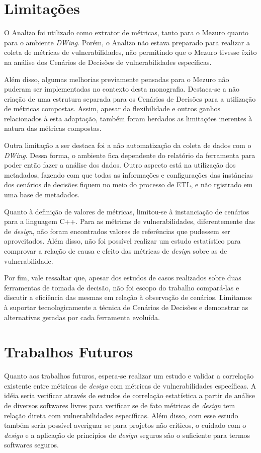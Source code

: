\section{Limitações}

O Analizo foi utilizado como extrator de métricas, tanto para o Mezuro quanto para o ambiente \emph{DWing}. Porém, o Analizo não estava preparado para realizar a coleta de métricas de vulnerabilidades, não permitindo que o Mezuro tivesse êxito na análise dos Cenários de Decisões de vulnerabilidades específicas. 

Além disso, algumas melhorias previamente pensadas para o Mezuro não puderam ser implementadas no contexto desta monografia. Destaca-se a não criação de uma estrutura separada para os Cenários de Decisões para a utilização de métricas compostas. Assim, apesar da flexibilidade e outros ganhos relacionados à esta adaptação, também foram herdados as limitações inerentes à natura das métricas compostas.

Outra limitação a ser destaca foi a não automatização da coleta de dados com o \emph{DWing}. Dessa forma, o ambiente fica dependente do relatório da ferramenta para poder então fazer a análise dos dados. Outro aspecto está na utilização dos metadados, fazendo com que todas as informações e configurações das instâncias dos cenários de decisões fiquem no meio do processo de ETL, e não rgistrado em uma base de metadados.

Quanto à definição de valores de métricas, limitou-se à instanciação de cenários para a linguagem C++. Para as métricas de vulnerabilidades, diferentemente das de \emph{design}, não foram encontrados valores de referências que pudessem ser aproveitados. Além disso, não foi possível realizar um estudo estatístico para comprovar a relação de causa e efeito das métricas de \emph{design} sobre as de vulnerabilidade.

Por fim, vale ressaltar que, apesar dos estudos de casos realizados sobre duas ferramentas de tomada de decisão, não foi escopo do trabalho compará-las e discutir a eficiência das mesmas em relação à observação de cenários. Limitamos à suportar tecnologicamente a técnica de Cenários de Decisões e demonstrar as alternativas geradas por cada ferramenta evoluída.

\section{Trabalhos Futuros}

Quanto aos trabalhos futuros, espera-se realizar um estudo e validar a correlação existente entre métricas de \emph{design} com métricas de vulnerabilidades específicas. A idéia seria verificar através de estudos de correlação estatística a partir de análise de diversos softwares livres para verificar se de fato métricas de \emph{design} tem relação direta com vulnerabilidades específicas. Além disso, com esse estudo também seria possível averiguar se para projetos não críticos, o cuidado com o \emph{design} e a aplicação de princípios de \emph{design} seguros são o suficiente para termos softwares seguros. 

